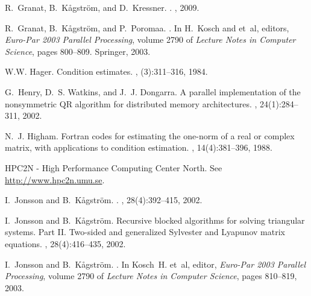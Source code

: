 \documentclass[11pt]{article}
\begin{document}
{\begin{thebibliography}{10}
R.~Granat, B.~K{\aa}gstr{\"{o}}m, and D.~Kressner.
.
,
  2009.

R.~Granat, B.~K{\aa}gstr{\"{o}}m, and P.~Poromaa.
.
\newblock In H.~Kosch and et~al, editors, {\em Euro-Par 2003 Parallel
  Processing}, volume 2790 of {\em Lecture Notes in Computer Science}, pages
  800--809. Springer, 2003.

W.W. Hager.
\newblock Condition estimates.
, (3):311--316, 1984.

G.~Henry, D.~S. Watkins, and J.~J. Dongarra.
\newblock A parallel implementation of the nonsymmetric {QR} algorithm for
  distributed memory architectures.
, 24(1):284--311, 2002.

N.~J. Higham.
\newblock Fortran codes for estimating the one-norm of a real or complex
  matrix, with applications to condition estimation.
, 14(4):381--396, 1988.

{HPC2N - High Performance Computing Center North}.
\newblock See \url{http://www.hpc2n.umu.se}.

I.~Jonsson and B.~K{\aa}gstr{\"o}m.
.
, 28(4):392--415, 2002.

I.~Jonsson and B.~K{\aa}gstr{\"o}m.
\newblock Recursive blocked algorithms for solving triangular systems. {Part
  II}. {T}wo-sided and generalized {S}ylvester and {L}yapunov matrix equations.
, 28(4):416--435, 2002.

I.~Jonsson and B.~K{\aa}gstr{\"{o}}m.
.
\newblock In Kosch~H. et~al, editor, {\em {Euro-Par 2003 Parallel Processing}},
  volume 2790 of {\em Lecture Notes in Computer Science}, pages 810--819, 2003.


\end{thebibliography}}
\end{document}
